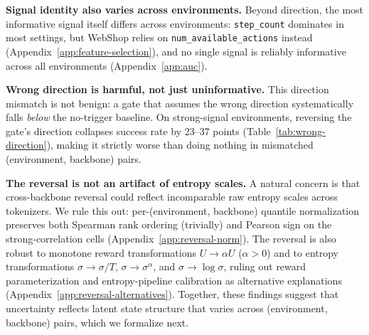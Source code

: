 \textbf{Signal identity also varies across environments.}
Beyond direction, the most informative signal itself differs across environments: \texttt{step\_count} dominates in most settings, but WebShop relies on \texttt{num\_available\_actions} instead (Appendix~\ref{app:feature-selection}), and no single signal is reliably informative across all environments (Appendix~\ref{app:auc}).

\textbf{Wrong direction is harmful, not just uninformative.}
This direction mismatch is not benign: a gate that assumes the wrong direction systematically falls \emph{below} the no-trigger baseline. On strong-signal environments, reversing the gate's direction collapses success rate by 23–37 points (Table~\ref{tab:wrong-direction}), making it strictly worse than doing nothing in mismatched (environment, backbone) pairs.

\textbf{The reversal is not an artifact of entropy scales.}
A natural concern is that cross-backbone reversal could reflect incomparable raw entropy scales across tokenizers. We rule this out: per-(environment, backbone) quantile normalization preserves both Spearman rank ordering (trivially) and Pearson sign on the strong-correlation cells (Appendix~\ref{app:reversal-norm}). The reversal is also robust to monotone reward transformations $U \!\to\! \alpha U$ ($\alpha > 0$) and to entropy transformations $\sigma \!\to\! \sigma/T$, $\sigma \!\to\! \sigma^\alpha$, and $\sigma \!\to\! \log\sigma$, ruling out reward parameterization and entropy-pipeline calibration as alternative explanations (Appendix~\ref{app:reversal-alternatives}). Together, these findings suggest that uncertainty reflects latent state structure that varies across (environment, backbone) pairs, which we formalize next.

\vspace{-0.1in}
